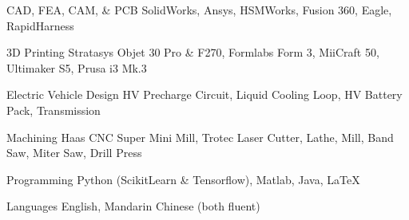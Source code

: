 


\begin{cvskills}


\cvskill
{CAD, FEA, CAM, \& PCB} %
{SolidWorks, Ansys, HSMWorks, Fusion 360, Eagle, RapidHarness} %


\cvskill
{3D Printing} %
{Stratasys Objet 30 Pro \& F270, Formlabs Form 3, MiiCraft 50, Ultimaker S5, Prusa i3 Mk.3} %

\cvskill
{Electric Vehicle Design}
{HV Precharge Circuit, Liquid Cooling Loop, HV Battery Pack, Transmission}


\cvskill
{Machining}
{Haas CNC Super Mini Mill, Trotec Laser Cutter, Lathe, Mill, Band Saw, Miter Saw, Drill Press}



\cvskill
{Programming} %
{Python (ScikitLearn \& Tensorflow), Matlab, Java, LaTeX} %

\cvskill
{Languages}
{English, Mandarin Chinese (both fluent)}


\end{cvskills}